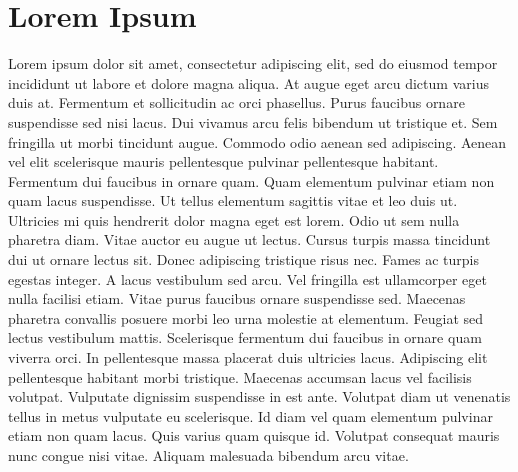 \documentclass[12pt]{article}
\begin{document}
\section*{Lorem Ipsum}
Lorem ipsum dolor sit amet, consectetur adipiscing elit, sed do eiusmod tempor incididunt ut labore et dolore magna aliqua. At augue eget arcu dictum varius duis at. Fermentum et sollicitudin ac orci phasellus. Purus faucibus ornare suspendisse sed nisi lacus. Dui vivamus arcu felis bibendum ut tristique et. Sem fringilla ut morbi tincidunt augue. Commodo odio aenean sed adipiscing. Aenean vel elit scelerisque mauris pellentesque pulvinar pellentesque habitant. Fermentum dui faucibus in ornare quam. Quam elementum pulvinar etiam non quam lacus suspendisse. Ut tellus elementum sagittis vitae et leo duis ut. Ultricies mi quis hendrerit dolor magna eget est lorem. Odio ut sem nulla pharetra diam. Vitae auctor eu augue ut lectus. Cursus turpis massa tincidunt dui ut ornare lectus sit. Donec adipiscing tristique risus nec. Fames ac turpis egestas integer. A lacus vestibulum sed arcu.
Vel fringilla est ullamcorper eget nulla facilisi etiam. Vitae purus faucibus ornare suspendisse sed. Maecenas pharetra convallis posuere morbi leo urna molestie at elementum. Feugiat sed lectus vestibulum mattis. Scelerisque fermentum dui faucibus in ornare quam viverra orci. In pellentesque massa placerat duis ultricies lacus. Adipiscing elit pellentesque habitant morbi tristique. Maecenas accumsan lacus vel facilisis volutpat. Vulputate dignissim suspendisse in est ante. Volutpat diam ut venenatis tellus in metus vulputate eu scelerisque. Id diam vel quam elementum pulvinar etiam non quam lacus. Quis varius quam quisque id. Volutpat consequat mauris nunc congue nisi vitae. Aliquam malesuada bibendum arcu vitae.
\end{document}
